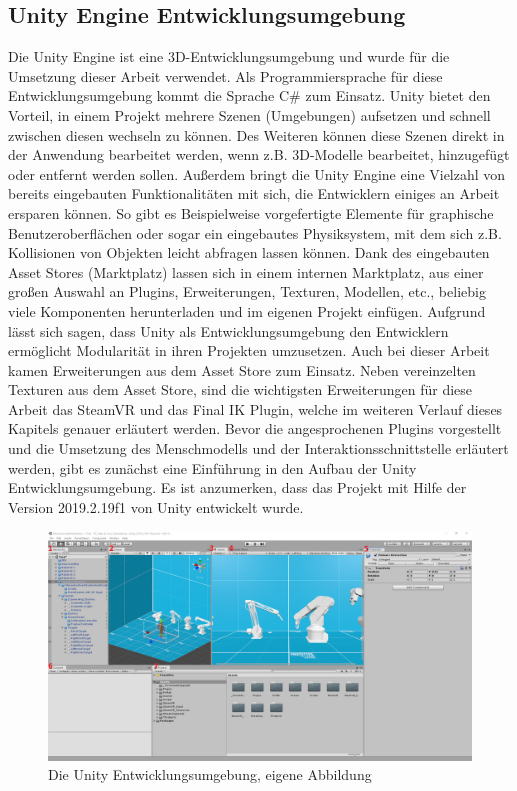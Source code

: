 \subsection{Unity Engine Entwicklungsumgebung}\label{sec:UnitEngine}
Die Unity Engine ist eine 3D-Entwicklungsumgebung und wurde für die Umsetzung dieser Arbeit verwendet. Als Programmiersprache für diese Entwicklungsumgebung kommt die Sprache C\# zum Einsatz. Unity bietet den Vorteil, in einem Projekt mehrere Szenen (Umgebungen) aufsetzen und schnell zwischen diesen wechseln zu können. Des Weiteren können diese Szenen direkt in der Anwendung bearbeitet werden, wenn z.B. 3D-Modelle bearbeitet, hinzugefügt oder entfernt werden sollen. Außerdem bringt die Unity Engine eine Vielzahl von bereits eingebauten Funktionalitäten mit sich, die Entwicklern einiges an Arbeit ersparen können. So gibt es Beispielweise vorgefertigte Elemente für graphische Benutzeroberflächen oder sogar ein eingebautes Physiksystem, mit dem sich z.B. Kollisionen von Objekten leicht abfragen lassen können. Dank des eingebauten Asset Stores (Marktplatz) lassen sich in einem internen Marktplatz, aus einer großen Auswahl an Plugins, Erweiterungen, Texturen, Modellen, etc., beliebig viele Komponenten herunterladen und im eigenen Projekt einfügen. Aufgrund lässt sich sagen, dass Unity als Entwicklungsumgebung den Entwicklern ermöglicht Modularität in ihren Projekten umzusetzen.
Auch bei dieser Arbeit kamen Erweiterungen aus dem Asset Store zum Einsatz. Neben vereinzelten Texturen aus dem Asset Store, sind die wichtigsten Erweiterungen für diese Arbeit das SteamVR und das Final IK Plugin, welche im weiteren Verlauf dieses Kapitels genauer erläutert werden.
\newline\newline
Bevor die angesprochenen Plugins vorgestellt und die Umsetzung des Menschmodells und der Interaktionsschnittstelle erläutert werden, gibt es zunächst eine Einführung in den Aufbau der Unity Entwicklungsumgebung. Es ist anzumerken, dass das Projekt mit Hilfe der Version 2019.2.19f1 von Unity entwickelt wurde.
\begin{figure}[h]
	\centering
	\includegraphics[width=1\linewidth]{Bilder/A47_UnityOverview2}
	\caption{Die Unity Entwicklungsumgebung, eigene Abbildung}
	\label{fig:UnityOverview}
\end{figure}
